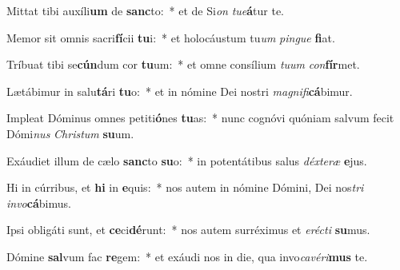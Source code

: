 \item Mittat tibi auxíli\textbf{um} de \textbf{sanc}to:~* et de Si\textit{on} \textit{tu}\textit{e}\textbf{á}tur te.
\item Memor sit omnis sacri\textbf{fí}cii \textbf{tu}i:~* et holocáustum tu\textit{um} \textit{pin}\textit{gue} \textbf{fi}at.
\item Tríbuat tibi se\textbf{cún}dum cor \textbf{tu}um:~* et omne consílium \textit{tu}\textit{um} \textit{con}\textbf{fír}met.
\item Lætábimur in salu\textbf{tá}ri \textbf{tu}o:~* et in nómine Dei nostri \textit{ma}\textit{gni}\textit{fi}\textbf{cá}bimur.
\item Impleat Dóminus omnes petiti\textbf{ó}nes \textbf{tu}as:~* nunc cognóvi quóniam salvum fecit Dómi\textit{nus} \textit{Chris}\textit{tum} \textbf{su}um.
\item Exáudiet illum de cælo \textbf{sanc}to \textbf{su}o:~* in potentátibus salus \textit{déx}\textit{te}\textit{ræ} \textbf{e}jus.
\item Hi in cúrribus, et \textbf{hi} in \textbf{e}quis:~* nos autem in nómine Dómini, Dei nos\textit{tri} \textit{in}\textit{vo}\textbf{cá}bimus.
\item Ipsi obligáti sunt, et \textbf{ce}ci\textbf{dé}runt:~* nos autem surréximus et \textit{e}\textit{réc}\textit{ti} \textbf{su}mus.
\item Dómine \textbf{sal}vum fac \textbf{re}gem:~* et exáudi nos in die, qua invo\textit{ca}\textit{vé}\textit{ri}\textbf{mus} te.
